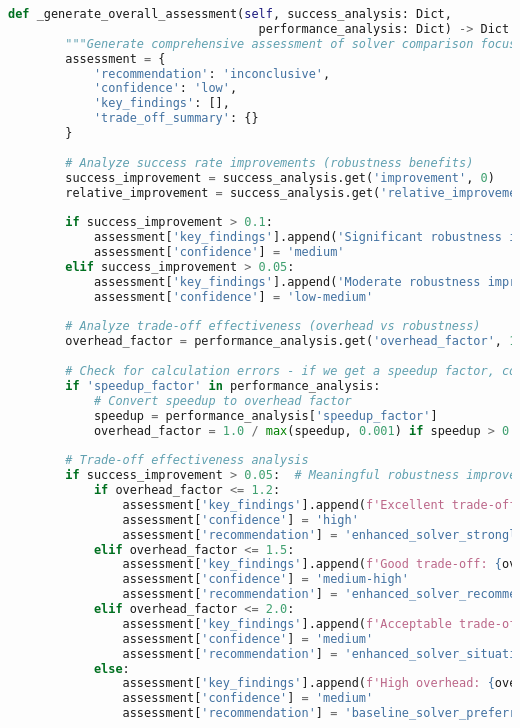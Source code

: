 \begin{lstlisting}[language=Python, caption=Statistical Analysis and Comparison Framework]
    def _generate_overall_assessment(self, success_analysis: Dict, 
                                   performance_analysis: Dict) -> Dict:
        """Generate comprehensive assessment of solver comparison focusing on trade-off effectiveness"""
        assessment = {
            'recommendation': 'inconclusive',
            'confidence': 'low',
            'key_findings': [],
            'trade_off_summary': {}
        }
        
        # Analyze success rate improvements (robustness benefits)
        success_improvement = success_analysis.get('improvement', 0)
        relative_improvement = success_analysis.get('relative_improvement', 0)
        
        if success_improvement > 0.1:
            assessment['key_findings'].append('Significant robustness improvement through enhanced success rate')
            assessment['confidence'] = 'medium'
        elif success_improvement > 0.05:
            assessment['key_findings'].append('Moderate robustness improvement')
            assessment['confidence'] = 'low-medium'
        
        # Analyze trade-off effectiveness (overhead vs robustness)
        overhead_factor = performance_analysis.get('overhead_factor', 1.0)
        
        # Check for calculation errors - if we get a speedup factor, convert it
        if 'speedup_factor' in performance_analysis:
            # Convert speedup to overhead factor
            speedup = performance_analysis['speedup_factor']
            overhead_factor = 1.0 / max(speedup, 0.001) if speedup > 0 else float('inf')
        
        # Trade-off effectiveness analysis
        if success_improvement > 0.05:  # Meaningful robustness improvement
            if overhead_factor <= 1.2:
                assessment['key_findings'].append(f'Excellent trade-off: {overhead_factor:.2f}x overhead with robustness benefits')
                assessment['confidence'] = 'high'
                assessment['recommendation'] = 'enhanced_solver_strongly_recommended'
            elif overhead_factor <= 1.5:
                assessment['key_findings'].append(f'Good trade-off: {overhead_factor:.2f}x overhead with solid robustness gains')
                assessment['confidence'] = 'medium-high'
                assessment['recommendation'] = 'enhanced_solver_recommended'
            elif overhead_factor <= 2.0:
                assessment['key_findings'].append(f'Acceptable trade-off: {overhead_factor:.2f}x overhead justified by robustness improvements')
                assessment['confidence'] = 'medium'
                assessment['recommendation'] = 'enhanced_solver_situational'
            else:
                assessment['key_findings'].append(f'High overhead: {overhead_factor:.2f}x may limit practical deployment')
                assessment['confidence'] = 'medium'
                assessment['recommendation'] = 'baseline_solver_preferred_for_speed'
        

\end{lstlisting}
